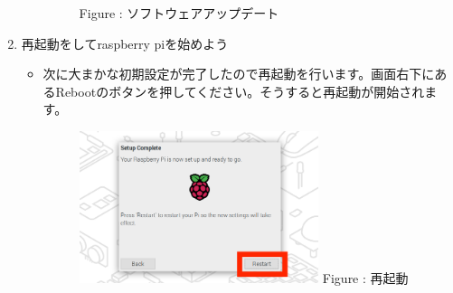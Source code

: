 \documentclass[a4paper,12pt]{jarticle}
\begin{document}
\begin{enumerate}
\begin{itemize}
\begin{figure}[h]
\begin{minipage}{5.228cm}
{                            \newline
                            Figure {\theFigure\label{seq:refFigure18}}:
                            ソフトウェアアップデート}
                        \end{minipage}
                      \end{figure}
                  \end{itemize}  
    \item
        再起動をしてraspberry piを始めよう
                \begin{itemize}
                  \item
                        次に大まかな初期設定が完了したので再起動を行います。画面右下にあるRebootのボタンを押してください。そうすると再起動が開始されます。
                        \begin{figure}[h]
                          \centering
                          \begin{minipage}{5.228cm}
                            {\upshape
                              \includegraphics[width=7.000cm]{sw_image08.png}
                              \newline
                              Figure {\theFigure\label{seq:refFigure19}}:
                              再起動}
                          \end{minipage}
                        \end{figure}
                      \end{itemize}  
\clearpage                    
\end{enumerate}
\end{document}
